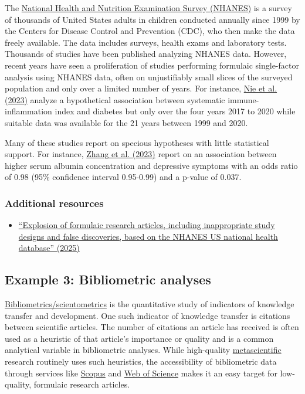 \documentclass[letterpaper, 12pt]{article}
\begin{document}
The \href{https://www.cdc.gov/nchs/nhanes/index.html}{National Health and Nutrition Examination Survey (NHANES)} is a survey of thousands of United States adults in children conducted annually since 1999 by the Centers for Disease Control and Prevention (CDC), who then make the data freely available. The data includes surveys, health exams and laboratory tests. Thousands of studies have been published analyzing NHANES data. However, recent years have seen a proliferation of studies performing formulaic single-factor analysis using NHANES data, often on unjustifiably small slices of the surveyed population and only over a limited number of years. For instance, \href{https://doi.org/10.3389/fendo.2023.1245199}{Nie et al. (2023)} analyze a hypothetical association between systematic immune-inflammation index and diabetes but only over the four years 2017 to 2020 while suitable data was available for the 21 years between 1999 and 2020.

Many of these studies report on specious hypotheses with little statistical support. For instance, \href{https://doi.org/10.1186/s12888-023-04935-1}{Zhang et al. (2023)} report on an association between higher serum albumin concentration and depressive symptoms with an odds ratio of 0.98 (95\% confidence interval 0.95-0.99) and a p-value of 0.037.

\subsubsection*{Additional resources}

\begin{itemize}
    \setlength\itemsep{-0.5em}
    \item \href{https://doi.org/10.1371/journal.pbio.3003152}{``Explosion of formulaic research articles, including inappropriate study designs and false discoveries, based on the NHANES US national health database'' (2025)}
\end{itemize}

\subsection*{Example 3: Bibliometric analyses}

\href{https://en.wikipedia.org/wiki/Bibliometrics}{Bibliometrics/scientometrics} is the quantitative study of indicators of knowledge transfer and development. One such indicator of knowledge transfer is citations between scientific articles. The number of citations an article has received is often used as a heuristic of that article's importance or quality and is a common analytical variable in bibliometric analyses. While high-quality \href{https://en.wikipedia.org/wiki/Metascience}{metascientific} research routinely uses such heuristics, the accessibility of bibliometric data through services like \href{https://scopus.com}{Scopus} and \href{/https://webofscience.com/}{Web of Science} makes it an easy target for low-quality, formulaic research articles. 
\end{document}
